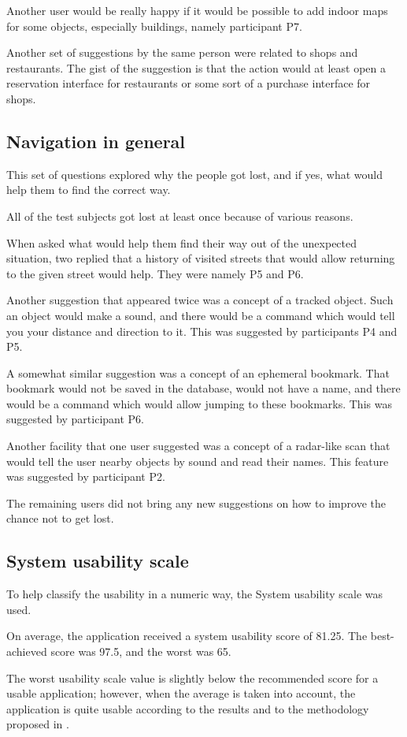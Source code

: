 \documentclass[nolof,digital]{fithesis3}
\begin{document}
Another user would be really happy if it would be possible to add indoor maps for some objects, especially buildings, namely participant P7.

Another set of suggestions by the same person were related to shops and restaurants. The gist of the suggestion is that the action would at least open a reservation interface for restaurants or some sort of a purchase interface for shops.
\subsection{Navigation in general}
This set of questions explored why the people got lost, and if yes, what would help them to find the correct way.

All of the test subjects got lost at least once because of various reasons.

When asked what would help them find their way out of the unexpected situation, two replied that a history of visited streets that would allow returning to the given street would help. They were namely P5 and P6.

Another suggestion that appeared twice was a concept of a tracked object. Such an object would make a sound, and there would be a command which would tell you your distance and direction to it. This was suggested by participants P4 and P5.

A somewhat similar suggestion was a concept of an ephemeral bookmark. That bookmark would not be saved in the database, would not have a name, and there would be a command which would allow jumping to these bookmarks. This was suggested by participant P6.

Another facility that one user suggested was a concept of a radar-like scan that would tell the user nearby objects by sound and read their names. This feature was suggested by participant P2.

The remaining users did not bring any new suggestions on how to improve the chance not to get lost.
\subsection{System usability scale}
To help classify the usability in a numeric way, the System usability scale was used.

On average, the application received a system usability score of 81.25. The best-achieved score was 97.5, and the worst was 65.

The worst usability scale value is slightly below the recommended score for a usable application; however, when the average is taken into account, the application is quite usable according to the results and to the methodology proposed in \parencite{SauroJeff2012Qtue}.
\end{document}
